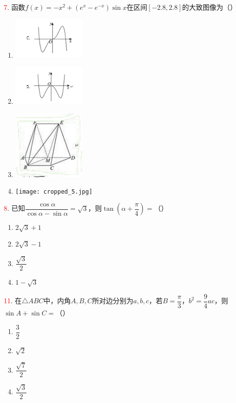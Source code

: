 \documentclass[12pt]{ctexart}
\begin{document}
\begin{enumerate}[label=\arabic*.]
    \item[\textcolor{red}{7}.] 函数\( f(x) = -x^2 + (e^x - e^{-x})\sin x \)在区间\([-2.8,2.8]\)的大致图像为（）
    \begin{enumerate}[label=\Alph*.]
        \item \includegraphics[width=0.3\textwidth]{cropped_2.jpg}
        \item \includegraphics[width=0.3\textwidth]{cropped_3.jpg}
        \item \includegraphics[width=0.3\textwidth]{cropped_4.jpg}
        \item \texttt{[image: cropped\_5.jpg]}
    \end{enumerate}
    
    \item[\textcolor{red}{8}.] 已知\( \dfrac{\cos\alpha}{\cos\alpha - \sin\alpha} = \sqrt{3} \)，则\( \tan\left(\alpha + \dfrac{\pi}{4}\right) = \)（）
    \begin{enumerate}[label=\Alph*.]
        \item \( 2\sqrt{3} + 1 \)
        \item \( 2\sqrt{3} - 1 \)
        \item \( \dfrac{\sqrt{3}}{2} \)
        \item \( 1 - \sqrt{3} \)
    \end{enumerate}
    
    \item[\textcolor{red}{11}.] 在\( \triangle ABC \)中，内角\( A,B,C \)所对边分别为\( a,b,c \)，若\( B = \dfrac{\pi}{3} \)，\( b^2 = \dfrac{9}{4}ac \)，则\( \sin A + \sin C = \)（）
    \begin{enumerate}[label=\Alph*.]
        \item \( \dfrac{3}{2} \)
        \item \( \sqrt{2} \)
        \item \( \dfrac{\sqrt{7}}{2} \)
        \item \( \dfrac{\sqrt{3}}{2} \)
    \end{enumerate}
\end{enumerate}
\end{document}
